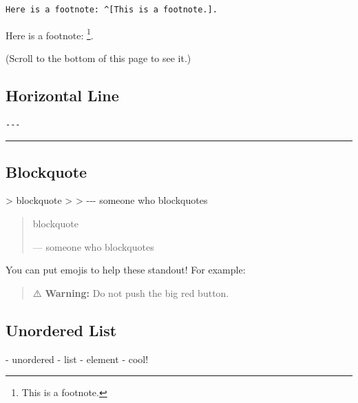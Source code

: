 \documentclass[
]{book}
\newenvironment{Shaded}{\begin{snugshade}}{\end{snugshade}}
\newcommand{\AttributeTok}[1]{\textcolor[rgb]{0.13,0.29,0.53}{#1}}
\newcommand{\NormalTok}[1]{#1}
\newcommand{\SpecialStringTok}[1]{\textcolor[rgb]{0.31,0.60,0.02}{#1}}
\theoremstyle{definition}
\theoremstyle{definition}
\theoremstyle{definition}
\theoremstyle{definition}
\theoremstyle{remark}
\begin{document}
\begin{verbatim}
Here is a footnote: ^[This is a footnote.].
\end{verbatim}

Here is a footnote: \footnote{This is a footnote.}.

(Scroll to the bottom of this page to see it.)

\subsection*{Horizontal Line}\label{horizontal-line}

\begin{verbatim}
---
\end{verbatim}

\begin{center}\rule{0.5\linewidth}{0.5pt}\end{center}

\subsection*{Blockquote}\label{blockquote}

\begin{Shaded}
\begin{Highlighting}[]
\AttributeTok{\textgreater{} blockquote}
\AttributeTok{\textgreater{}}
\AttributeTok{\textgreater{} {-}{-}{-} someone who blockquotes}
\end{Highlighting}
\end{Shaded}

\begin{quote}
blockquote

--- someone who blockquotes
\end{quote}

You can put emojis to help these standout! For example:

\begin{quote}
⚠️ \textbf{Warning:} Do not push the big red button.
\end{quote}

\subsection*{Unordered List}\label{unordered-list}

\begin{Shaded}
\begin{Highlighting}[]
\SpecialStringTok{{-} }\NormalTok{unordered}
\SpecialStringTok{  {-} }\NormalTok{list}
\SpecialStringTok{    {-} }\NormalTok{element}
\SpecialStringTok{{-} }\NormalTok{cool!}
\end{Highlighting}
\end{Shaded}
\end{document}
